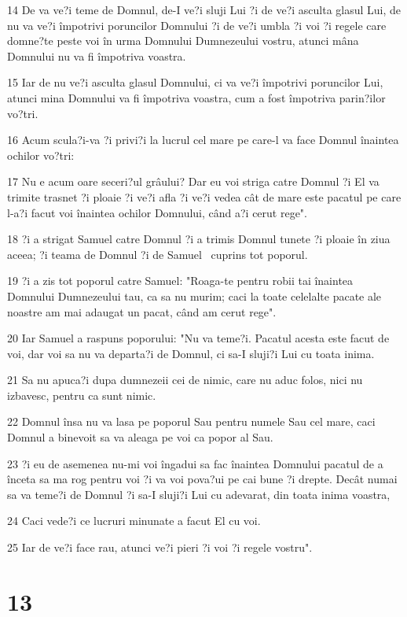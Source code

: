 \par 14 De va ve?i teme de Domnul, de-I ve?i sluji Lui ?i de ve?i asculta glasul Lui, de nu va ve?i împotrivi poruncilor Domnului ?i de ve?i umbla ?i voi ?i regele care domne?te peste voi în urma Domnului Dumnezeului vostru, atunci mâna Domnului nu va fi împotriva voastra.
\par 15 Iar de nu ve?i asculta glasul Domnului, ci va ve?i împotrivi poruncilor Lui, atunci mina Domnului va fi împotriva voastra, cum a fost împotriva parin?ilor vo?tri.
\par 16 Acum scula?i-va ?i privi?i la lucrul cel mare pe care-l va face Domnul înaintea ochilor vo?tri:
\par 17 Nu e acum oare seceri?ul grâului? Dar eu voi striga catre Domnul ?i El va trimite trasnet ?i ploaie ?i ve?i afla ?i ve?i vedea cât de mare este pacatul pe care l-a?i facut voi înaintea ochilor Domnului, când a?i cerut rege".
\par 18 ?i a strigat Samuel catre Domnul ?i a trimis Domnul tunete ?i ploaie în ziua aceea; ?i teama de Domnul ?i de Samuel  cuprins tot poporul.
\par 19 ?i a zis tot poporul catre Samuel: "Roaga-te pentru robii tai înaintea Domnului Dumnezeului tau, ca sa nu murim; caci la toate celelalte pacate ale noastre am mai adaugat un pacat, când am cerut rege".
\par 20 Iar Samuel a raspuns poporului: "Nu va teme?i. Pacatul acesta este facut de voi, dar voi sa nu va departa?i de Domnul, ci sa-I sluji?i Lui cu toata inima.
\par 21 Sa nu apuca?i dupa dumnezeii cei de nimic, care nu aduc folos, nici nu izbavesc, pentru ca sunt nimic.
\par 22 Domnul însa nu va lasa pe poporul Sau pentru numele Sau cel mare, caci Domnul a binevoit sa va aleaga pe voi ca popor al Sau.
\par 23 ?i eu de asemenea nu-mi voi îngadui sa fac înaintea Domnului pacatul de a înceta sa ma rog pentru voi ?i va voi pova?ui pe cai bune ?i drepte. Decât numai sa va teme?i de Domnul ?i sa-I sluji?i Lui cu adevarat, din toata inima voastra,
\par 24 Caci vede?i ce lucruri minunate a facut El cu voi.
\par 25 Iar de ve?i face rau, atunci ve?i pieri ?i voi ?i regele vostru".

\chapter{13}

